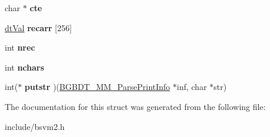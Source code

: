 \begin{DoxyCompactItemize}
\item 
\hypertarget{structBGBDT__MM__ParsePrintInfo__s_add812cae2fa28f414616803310359b9f}{char $\ast$ {\bfseries cte}}\label{structBGBDT__MM__ParsePrintInfo__s_add812cae2fa28f414616803310359b9f}

\item 
\hypertarget{structBGBDT__MM__ParsePrintInfo__s_ae07b9475d961cfef25c67d36b68db161}{\hyperlink{unionBGBDT__TagValue__s}{dt\-Val} {\bfseries recarr} \mbox{[}256\mbox{]}}\label{structBGBDT__MM__ParsePrintInfo__s_ae07b9475d961cfef25c67d36b68db161}

\item 
\hypertarget{structBGBDT__MM__ParsePrintInfo__s_a62f10c301257c5981c1ec68678b7554d}{int {\bfseries nrec}}\label{structBGBDT__MM__ParsePrintInfo__s_a62f10c301257c5981c1ec68678b7554d}

\item 
\hypertarget{structBGBDT__MM__ParsePrintInfo__s_a728b3955af83053dc03b97deaa0db8cf}{int {\bfseries nchars}}\label{structBGBDT__MM__ParsePrintInfo__s_a728b3955af83053dc03b97deaa0db8cf}

\item 
\hypertarget{structBGBDT__MM__ParsePrintInfo__s_a01fc57794d188b556df76cf94bd86c48}{int($\ast$ {\bfseries putstr} )(\hyperlink{structBGBDT__MM__ParsePrintInfo__s}{B\-G\-B\-D\-T\-\_\-\-M\-M\-\_\-\-Parse\-Print\-Info} $\ast$inf, char $\ast$str)}\label{structBGBDT__MM__ParsePrintInfo__s_a01fc57794d188b556df76cf94bd86c48}

\end{DoxyCompactItemize}


The documentation for this struct was generated from the following file\-:\begin{DoxyCompactItemize}
\item 
include/bsvm2.\-h\end{DoxyCompactItemize}
